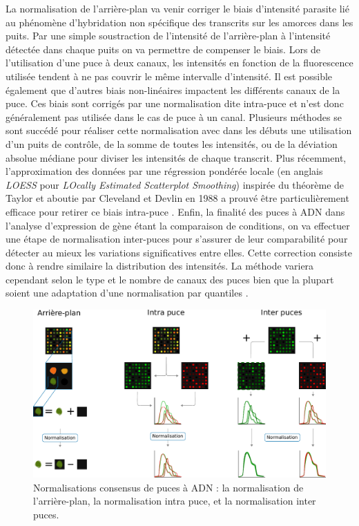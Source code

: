La normalisation de l'arrière-plan va venir corriger le biais d'intensité parasite lié au phénomène d'hybridation non spécifique des transcrits sur les amorces dans les puits. Par une simple soustraction de l'intensité de l'arrière-plan à l'intensité détectée dans chaque puits on va permettre de compenser le biais. Lors de l'utilisation d'une puce à deux canaux, les intensités en fonction de la fluorescence utilisée tendent à ne pas couvrir le même intervalle d'intensité. Il est possible également que d'autres biais non-linéaires impactent les différents canaux de la puce. Ces biais sont corrigés par une normalisation dite intra-puce et n'est donc généralement pas utilisée dans le cas de puce à un canal. Plusieurs méthodes se sont succédé pour réaliser cette normalisation avec dans les débuts une utilisation d'un puits de contrôle, de la somme de toutes les intensités, ou de la déviation absolue médiane pour diviser les intensités de chaque transcrit. Plus récemment, l'approximation des données par une régression pondérée locale (en anglais \textit{LOESS} pour \textit{LOcally Estimated Scatterplot Smoothing}) inspirée du théorème de Taylor et aboutie par Cleveland et Devlin en 1988 \cite{Cleveland1988Sep} a prouvé être particulièrement efficace pour retirer ce biais intra-puce \cite{Smyth2003Dec}. Enfin, la finalité des puces à ADN dans l'analyse d'expression de gène étant la comparaison de conditions, on va effectuer une étape de normalisation inter-puces pour s'assurer de leur comparabilité pour détecter au mieux les variations significatives entre elles. Cette correction consiste donc à rendre similaire la distribution des intensités. La méthode variera cependant selon le type et le nombre de canaux des puces bien que la plupart soient une adaptation d'une normalisation par quantiles \cite{Ritchie2015Apr}. \\

\begin{figure}[!h]
    \centering
    \includegraphics[width=\textwidth]{img/intro/2_meth_transcripto/intro_2_microarray_normalization.pdf}
    \caption[Normalisations consensus de puces à ADN]{Normalisations consensus de puces à ADN : la normalisation de l'arrière-plan, la normalisation intra puce, et la normalisation inter puces.}
    \label{fig:microarray_normalization}
\end{figure}


